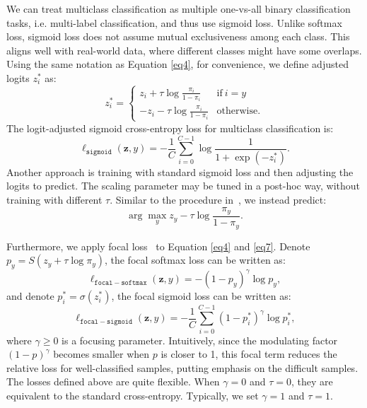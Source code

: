 \documentclass[runningheads]{llncs}
\begin{document}
We can treat multiclass classification as multiple one-vs-all binary classification tasks, i.e. multi-label classification, and thus use sigmoid loss. Unlike softmax loss, sigmoid loss does not assume mutual exclusiveness among each class. This aligns well with real-world data, where different classes might have some overlaps. Using the same notation as Equation \eqref{eq4}, for convenience, we define adjusted logits $z_i^\ast$ as:
\begin{equation}
z_i^\ast=
\begin{cases}
z_i+\tau\log\frac{\pi_i}{1-\pi_i} &\text{if}\ i=y \\
-z_i-\tau\log\frac{\pi_i}{1-\pi_i} &\text{otherwise}.
\end{cases}
\end{equation}
The logit-adjusted sigmoid cross-entropy loss for multiclass classification is:
\begin{equation}\label{eq7}
\ell_\mathtt{sigmoid}(\mathbf{z},y)=-\frac{1}{C}\sum_{i=0}^{C-1}\log\frac{1}{1+\exp(-z_i^\ast)}.
\end{equation}
Another approach is training with standard sigmoid loss and then adjusting the logits to predict. The scaling parameter may be tuned in a post-hoc way, without training with different $\tau$. Similar to the procedure in~\cite{menon2020long}, we instead predict:
\begin{equation}\label{eq8}
\arg\max_y z_y-\tau\log\frac{\pi_y}{1-\pi_y}.
\end{equation}

Furthermore, we apply focal loss~\cite{lin2017focal} to Equation \eqref{eq4} and \eqref{eq7}. Denote $p_y=S(z_y+\tau\log\pi_y)$, the focal softmax loss can be written as:
\begin{equation}
\ell_\mathtt{focal-softmax}(\mathbf{z},y)=-(1-p_y)^\gamma\log p_y,
\end{equation}
and denote $p_i^\ast=\sigma(z_i^\ast)$, the focal sigmoid loss can be written as:
\begin{equation}\label{eq10}
\ell_\mathtt{focal-sigmoid}(\mathbf{z},y)=-\frac{1}{C}\sum_{i=0}^{C-1}(1-p_i^\ast)^\gamma\log p_i^\ast,
\end{equation}
where $\gamma\ge 0$ is a focusing parameter. Intuitively, since the modulating factor $(1-p)^\gamma$ becomes smaller when $p$ is closer to 1, this focal term reduces the relative loss for well-classified samples, putting emphasis on the difficult samples. The losses defined above are quite flexible. When $\gamma=0$ and $\tau=0$, they are equivalent to the standard cross-entropy. Typically, we set $\gamma=1$ and $\tau=1$.
\end{document}
